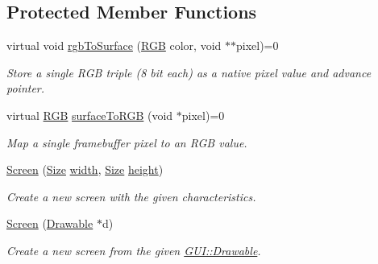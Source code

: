 \subsection*{Protected Member Functions}
\begin{DoxyCompactItemize}
\item 
\hypertarget{classGUI_1_1Screen_a58999d2d77eb53b064b893e1c096c1c0}{virtual void \hyperlink{classGUI_1_1Screen_a58999d2d77eb53b064b893e1c096c1c0}{rgb\-To\-Surface} (\hyperlink{namespaceGUI_aeafd135255365f3584da0e982fc79466}{R\-G\-B} color, void $\ast$$\ast$pixel)=0}\label{classGUI_1_1Screen_a58999d2d77eb53b064b893e1c096c1c0}

\begin{DoxyCompactList}\small\item\em Store a single R\-G\-B triple (8 bit each) as a native pixel value and advance pointer. \end{DoxyCompactList}\item 
\hypertarget{classGUI_1_1Screen_a0512d1dfadc6e7800b3c9c97fd6c733e}{virtual \hyperlink{namespaceGUI_aeafd135255365f3584da0e982fc79466}{R\-G\-B} \hyperlink{classGUI_1_1Screen_a0512d1dfadc6e7800b3c9c97fd6c733e}{surface\-To\-R\-G\-B} (void $\ast$pixel)=0}\label{classGUI_1_1Screen_a0512d1dfadc6e7800b3c9c97fd6c733e}

\begin{DoxyCompactList}\small\item\em Map a single framebuffer pixel to an R\-G\-B value. \end{DoxyCompactList}\item 
\hypertarget{classGUI_1_1Screen_a04241cd66c7f02485574dac750164b16}{\hyperlink{classGUI_1_1Screen_a04241cd66c7f02485574dac750164b16}{Screen} (\hyperlink{namespaceGUI_a10b6232e08729baa0bd211a86a69ce36}{Size} \hyperlink{classGUI_1_1Window_a6cd42974c2b9239d05dac79d284f427d}{width}, \hyperlink{namespaceGUI_a10b6232e08729baa0bd211a86a69ce36}{Size} \hyperlink{classGUI_1_1Window_a5bbb3975f91e7572fc1a91c44e59d212}{height})}\label{classGUI_1_1Screen_a04241cd66c7f02485574dac750164b16}

\begin{DoxyCompactList}\small\item\em Create a new screen with the given characteristics. \end{DoxyCompactList}\item 
\hypertarget{classGUI_1_1Screen_a240e1fb5ac8772cf01b9627792d544b3}{\hyperlink{classGUI_1_1Screen_a240e1fb5ac8772cf01b9627792d544b3}{Screen} (\hyperlink{classGUI_1_1Drawable}{Drawable} $\ast$d)}\label{classGUI_1_1Screen_a240e1fb5ac8772cf01b9627792d544b3}

\begin{DoxyCompactList}\small\item\em Create a new screen from the given \hyperlink{classGUI_1_1Drawable}{G\-U\-I\-::\-Drawable}. \end{DoxyCompactList}\end{DoxyCompactItemize}
